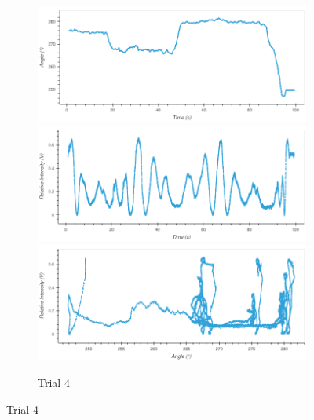 \begin{figure}
\begin{subfigure}{1.0\textwidth}
\caption*{Trial 4}
\includegraphics[width=\plotwidth]{plots/t4-time-angle.png}
\includegraphics[width=\plotwidth]{plots/t4-time-intensity.png}
\includegraphics[width=\plotwidth]{plots/t4-angle-intensity.png}
\end{subfigure}




\end{figure}
